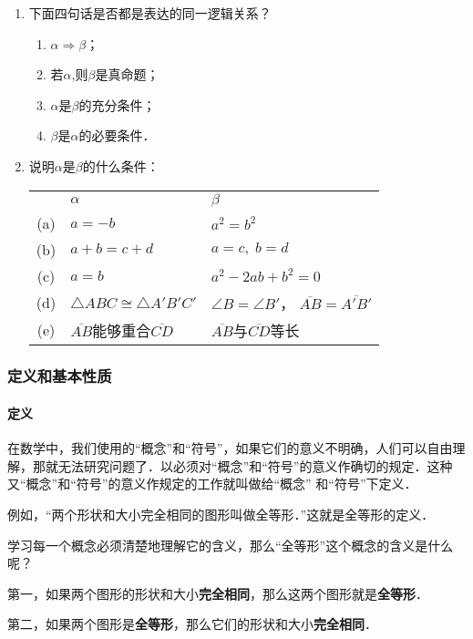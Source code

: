 \begin{ex}
	\begin{enumerate}
		\item 下面四句话是否都是表达的同一逻辑关系？
		\begin{enumerate}
			\item $\alpha\Rightarrow\beta$；
			\item 若$\alpha$,则$\beta$是真命题；
			\item $\alpha$是$\beta$的充分条件；
			\item $\beta$是$\alpha$的必要条件．
		\end{enumerate}
		
		\item 说明$\alpha$是$\beta$的什么条件：
		
		\begin{tabular}{cll}
			& $\alpha$ &$\beta$\\
			(a)& $a=-b$ &$a^2=b^2$\\
			(b)& $a+b=c+d$ & $a=c,\; b=d$\\
			(c)& $a=b$ & $a^2-2ab+b^2=0$\\
			(d)& $\triangle ABC\cong \triangle A'B'C'$ & $\angle B=\angle B'$，
			$\overline{AB}=\overline{A'B'}$\\
			(e)&  $\overline{AB}$能够重合$\overline{CD}$
			& $\overline{AB}$与$\overline{CD}$等长
		\end{tabular}
	\end{enumerate}
\end{ex}

\subsubsection{定义和基本性质}
\paragraph{定义}
在数学中，我们使用的“概念”和“符号”，如果它们的意义不明确，人们可以自由理解，那就无法研究问题了．以必须对“概念”和“符号”的意义作确切的规定．这种又“概念”和“符号”的意义作规定的工作就叫做给“概念”
和“符号”下定义．

例如，“两个形状和大小完全相同的图形叫做全等形．”这就是全等形的定义．

学习每一个概念必须清楚地理解它的含义，那么“全等形”这个概念的含义是什么呢？

第一，如果两个图形的形状和大小\textbf{完全相同}，那么这两个图形就是\textbf{全等形}．

第二，如果两个图形是\textbf{全等形}，那么它们的形状和大小\textbf{完全相同}．

